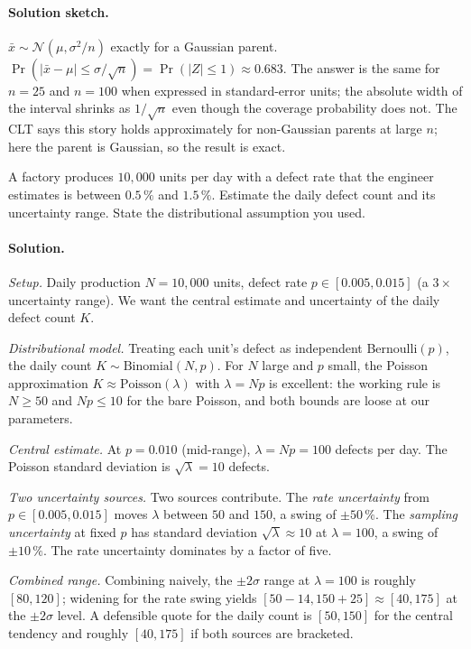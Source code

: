 \paragraph{Solution sketch.}
$\bar{x} \sim \mathcal{N}(\mu, \sigma^{2}/n)$ exactly for a
Gaussian parent. $\Pr(|\bar{x} - \mu| \leq \sigma/\sqrt{n}) =
\Pr(|Z| \leq 1) \approx 0.683$. The answer is the same for $n =
25$ and $n = 100$ when expressed in standard-error units; the
absolute width of the interval shrinks as $1/\sqrt{n}$ even though
the coverage probability does not. The CLT says this story holds
approximately for non-Gaussian parents at large $n$; here the
parent is Gaussian, so the result is exact.

\begin{exercise}
A factory produces $10{,}000$ units per day with a defect rate
that the engineer estimates is between $0.5 \,\%$ and $1.5 \,\%$.
Estimate the daily defect count and its uncertainty range. State
the distributional assumption you used.
\end{exercise}

\paragraph{Solution.}
\textit{Setup.} Daily production $N = 10{,}000$ units, defect rate
$p \in [0.005, 0.015]$ (a $3 \times$ uncertainty range). We want
the central estimate and uncertainty of the daily defect count $K$.

\textit{Distributional model.} Treating each unit's defect as
independent Bernoulli$(p)$, the daily count
$K \sim \text{Binomial}(N, p)$. For $N$ large and $p$ small, the
Poisson approximation $K \approx \text{Poisson}(\lambda)$ with
$\lambda = Np$ is excellent: the working rule is $N \geq 50$ and
$Np \leq 10$ for the bare Poisson, and both bounds are loose at our
parameters.

\textit{Central estimate.} At $p = 0.010$ (mid-range), $\lambda =
N p = 100$ defects per day. The Poisson standard deviation is
$\sqrt{\lambda} = 10$ defects.

\textit{Two uncertainty sources.} Two sources contribute. The
\emph{rate uncertainty} from $p \in [0.005, 0.015]$ moves $\lambda$
between $50$ and $150$, a swing of $\pm 50 \,\%$. The
\emph{sampling uncertainty} at fixed $p$ has standard deviation
$\sqrt{\lambda} \approx 10$ at $\lambda = 100$, a swing of
$\pm 10 \,\%$. The rate uncertainty dominates by a factor of five.

\textit{Combined range.} Combining naively, the $\pm 2\sigma$ range
at $\lambda = 100$ is roughly $[80, 120]$; widening for the rate
swing yields $[50 - 14, 150 + 25] \approx [40, 175]$ at the
$\pm 2\sigma$ level. A defensible quote for the daily count is
$[50, 150]$ for the central tendency and roughly $[40, 175]$ if
both sources are bracketed.

